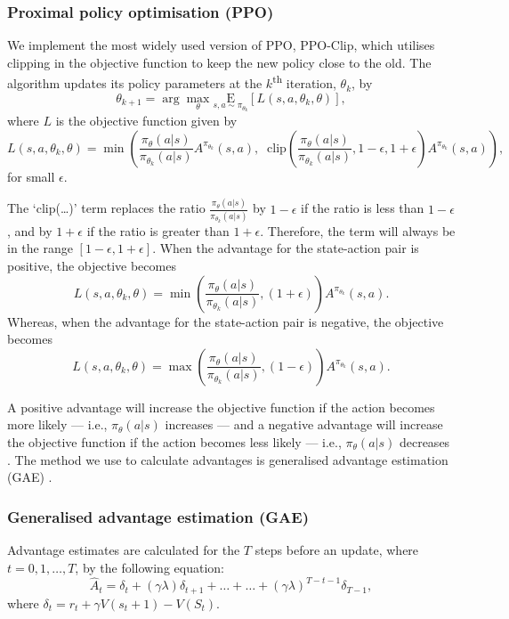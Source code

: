 \documentclass[12pt,a4paper]{article}
\begin{document}

\subsubsection{Proximal policy optimisation (PPO)}
We implement the most widely used version of PPO, PPO-Clip, which utilises clipping in the objective function to keep the new policy close to the old. The algorithm updates its policy parameters at the $k$\textsuperscript{th} iteration, $\theta_k$,  by \[\theta_{k+1} = \arg \max_{\theta} \underset{s,a \sim \pi_{\theta_k}}{{\mathrm E}}\left[L(s,a,\theta_k, \theta)\right],\] where $L$ is the objective function given by \[L(s,a,\theta_k,\theta) = \min\left(\frac{\pi_{\theta}(a|s)}{\pi_{\theta_k}(a|s)}  A^{\pi_{\theta_k}}(s,a), \;\;\text{clip}\left(\frac{\pi_{\theta}(a|s)}{\pi_{\theta_k}(a|s)}, 1 - \epsilon, 1+\epsilon \right) A^{\pi_{\theta_k}}(s,a) \right),\] for small $\epsilon$. 

The `clip(\dots)' term replaces the ratio $\frac{\pi_{\theta}(a|s)}{\pi_{\theta_k}(a|s)}$ by $1 - \epsilon$ if the ratio is less than $1 - \epsilon$, and by $1 + \epsilon$ if the ratio is greater than $1 + \epsilon$. Therefore, the term will always be in the range $\left[1 - \epsilon, 1 + \epsilon \right]$. When the advantage for the state-action pair is positive, the objective becomes \[L(s,a,\theta_k,\theta) = \min\left(\frac{\pi_{\theta}(a|s)}{\pi_{\theta_k}(a|s)}, (1 + \epsilon) \right)  A^{\pi_{\theta_k}}(s,a).\] Whereas, when the advantage for the state-action pair is negative, the objective becomes \[L(s,a,\theta_k,\theta) = \max\left(\frac{\pi_{\theta}(a|s)}{\pi_{\theta_k}(a|s)}, (1 - \epsilon) \right)  A^{\pi_{\theta_k}}(s,a).\]

A positive advantage will increase the objective function if the action becomes more likely --- i.e., \(\pi_{\theta}(a|s)\) increases --- and a negative advantage will increase the objective function if the action becomes less likely --- i.e., \(\pi_{\theta}(a|s)\) decreases \cite{SpinningUp2018}. The method we use to calculate advantages is generalised advantage estimation (GAE) \cite{schulman2018highdimensional}.

\subsubsection{Generalised advantage estimation (GAE)}
Advantage estimates are calculated for the $T$ steps before an update, where $t = 0, 1, \dots, T$, by the following equation: $$\hat{A}_t = \delta_t + (\gamma\lambda)\delta_{t+1} + \dots + \dots + (\gamma\lambda)^{T-t-1}\delta_{T-1},$$ where $\delta_t = r_t + \gamma V(s_t+1) - V(S_t)$.
\end{document}
